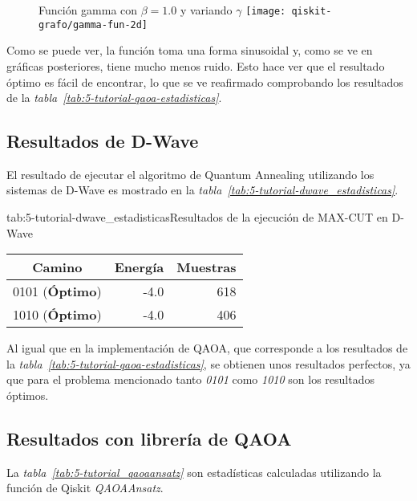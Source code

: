 \begin{figure}[htbp]{}{Función gamma con \(\beta = 1.0\) y variando \(\gamma\)}
  \texttt{[image: qiskit-grafo/gamma-fun-2d]}
\end{figure}

Como se puede ver, la función toma una forma sinusoidal y, como se ve en gráficas posteriores, tiene mucho menos ruido. Esto hace ver que el resultado óptimo es fácil de encontrar, lo que se ve reafirmado comprobando los resultados de la \textit{tabla~\ref{tab:5-tutorial-qaoa-estadisticas}}.

\subsection{Resultados de D-Wave}

El resultado de ejecutar el algoritmo de Quantum Annealing utilizando los sistemas de D-Wave es mostrado en la \textit{tabla~\ref{tab:5-tutorial-dwave_estadisticas}}.

\begin{table}[htbp]{tab:5-tutorial-dwave_estadisticas}{Resultados de la ejecución de MAX-CUT en D-Wave}
  \begin{tabular}{|c|r|r|}
    \hline
    \textbf{Camino}        & \textbf{Energía} & \textbf{Muestras} \\ \hline
    0101 (\textbf{Óptimo}) & -4.0             & 618               \\ \hline
    1010 (\textbf{Óptimo}) & -4.0             & 406               \\ \hline
  \end{tabular}
\end{table}

Al igual que en la implementación de QAOA, que corresponde a los resultados de la \textit{tabla~\ref{tab:5-tutorial-qaoa-estadisticas}}, se obtienen unos resultados perfectos, ya que para el problema mencionado tanto \textit{0101} como \textit{1010} son los resultados óptimos.

\subsection{Resultados con librería de QAOA}

La \textit{tabla~\ref{tab:5-tutorial_qaoaansatz}} son estadísticas calculadas utilizando la función de Qiskit \textit{QAOAAnsatz}.

